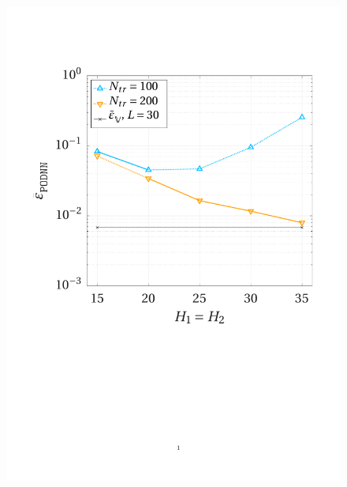 \documentclass[longtitle]{elsarticle}
\numberwithin{equation}{section}
\theoremstyle{theorem}
\theoremstyle{definition}
\theoremstyle{remark}
\theoremstyle{proposition}
\numberwithin{figure}{section}
\begin{document}
\begin{figure}[t!]
			\center
			\includegraphics[scale = 0.38, trim = {1.5cm 9.6cm 1.5cm 3.8cm}, clip]{poisson2d_nn_convergence}
			\hspace*{1cm}

\end{figure}
\end{document}
